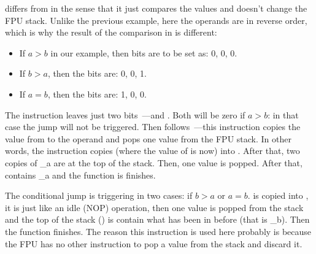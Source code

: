 



\FCOM differs from \FCOMP in the sense that it just compares the values and doesn't change the FPU stack. 
Unlike the previous example, here the operands are in reverse order, 
which is why the result of the comparison in \CThreeBits is different:

\begin{itemize}
\item If $a>b$ in our example, then \CThreeBits bits are to be set as: 0, 0, 0.
\item If $b>a$, then the bits are: 0, 0, 1.
\item If $a=b$, then the bits are: 1, 0, 0.
\end{itemize}

The  instruction leaves just two bits~---\Cthree and \Czero. 
Both will be zero if $a>b$: in that case the \JNE jump will not be triggered. 
Then  follows~---this instruction copies the value from  to the operand and 
pops one value from the FPU stack.
In other words, the instruction copies  (where the value of  is now) into .
After that, two copies of {\_a} are at the top of the stack. 
Then, one value is popped.
After that,  contains {\_a} and the function is finishes.

The conditional jump \JNE is triggering in two cases: if $b>a$ or $a=b$. 
 is copied into , it is just like an idle (\ac{NOP}) operation, then one value 
is popped from the stack and the top of the stack () is contain what has been in  before 
(that is {\_b}). 
Then the function finishes. 
The reason this instruction is used here probably is because the \ac{FPU} 
has no other instruction to pop a value from the stack and discard it.


